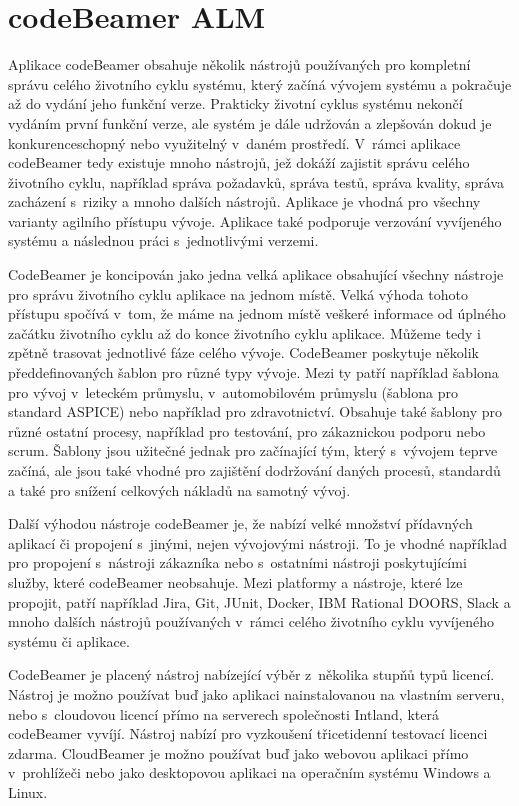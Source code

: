 \documentclass[czech,master]{diploma}
\begin{document}
\section{codeBeamer ALM}
\label{sec:codebeamer}
Aplikace codeBeamer obsahuje několik nástrojů používaných pro kompletní správu celého životního cyklu systému, který začíná vývojem systému a pokračuje až do vydání jeho funkční verze. Prakticky životní cyklus systému nekončí vydáním první funkční verze, ale systém je dále udržován a zlepšován dokud je konkurenceschopný nebo využitelný v~daném prostředí. V~rámci aplikace codeBeamer tedy existuje mnoho nástrojů, jež dokáží zajistit správu celého životního cyklu, například správa požadavků, správa testů, správa kvality, správa zacházení s~riziky a mnoho dalších nástrojů. Aplikace je vhodná pro všechny varianty agilního přístupu vývoje. Aplikace také podporuje verzování vyvíjeného systému a následnou práci s~jednotlivými verzemi. \cite{ref:about_codebeamer}

CodeBeamer je koncipován jako jedna velká aplikace obsahující všechny nástroje pro správu životního cyklu aplikace na jednom místě. Velká výhoda tohoto přístupu spočívá v~tom, že máme na jednom místě veškeré informace od úplného začátku životního cyklu až do konce životního cyklu aplikace. Můžeme tedy i zpětně trasovat jednotlivé fáze celého vývoje. CodeBeamer poskytuje několik předdefinovaných šablon pro různé typy vývoje. Mezi ty patří například šablona pro vývoj v~leteckém průmyslu, v~automobilovém průmyslu (šablona pro standard ASPICE) nebo například pro zdravotnictví. Obsahuje také šablony pro různé ostatní procesy, například pro testování, pro zákaznickou podporu nebo scrum.  \cite{ref:codebeamer_templates} Šablony jsou užitečné jednak pro začínající tým, který s~vývojem teprve začíná, ale jsou také vhodné pro zajištění dodržování daných procesů, standardů a také pro snížení celkových nákladů na samotný vývoj.

Další výhodou nástroje codeBeamer je, že nabízí velké množství přídavných aplikací či propojení s~jinými, nejen vývojovými nástroji. To je vhodné například pro propojení s~nástroji zákazníka nebo s~ostatními nástroji poskytujícími služby, které codeBeamer neobsahuje. Mezi platformy a nástroje, které lze propojit, patří například Jira, Git, JUnit, Docker, IBM Rational DOORS, Slack a mnoho dalších nástrojů používaných v~rámci celého životního cyklu vyvíjeného systému či aplikace.

CodeBeamer je placený nástroj nabízející výběr z~několika stupňů typů licencí.  Nástroj je možno používat buď jako aplikaci nainstalovanou na vlastním serveru, nebo s~cloudovou licencí přímo na serverech společnosti Intland, která codeBeamer vyvíjí. Nástroj nabízí pro vyzkoušení třicetidenní testovací licenci zdarma. CloudBeamer je možno používat buď jako webovou aplikaci přímo v~prohlížeči nebo jako desktopovou aplikaci na operačním systému Windows a Linux. \cite{ref:codebeamer_pricing}
\end{document}
